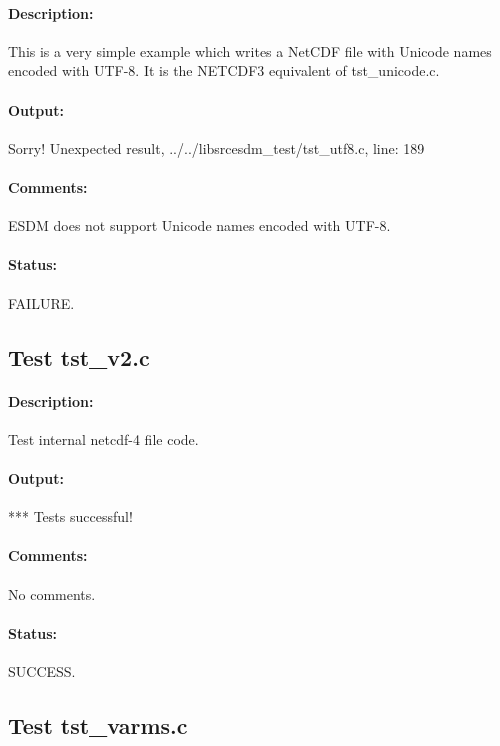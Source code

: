 \paragraph{Description:} This is a very simple example which writes a NetCDF file with Unicode names encoded with UTF-8.
It is the NETCDF3 equivalent of tst\_unicode.c.

\paragraph{Output:} Sorry! Unexpected result, ../../libsrcesdm\_test/tst\_utf8.c, line: 189

\paragraph{Comments:} ESDM does not support Unicode names encoded with UTF-8.

\paragraph{Status:} FAILURE.

\subsection{Test tst\_v2.c}

\paragraph{Description:} Test internal netcdf-4 file code.

\paragraph{Output:} *** Tests successful!

\paragraph{Comments:} No comments.

\paragraph{Status:} SUCCESS.

\subsection{Test tst\_varms.c}

